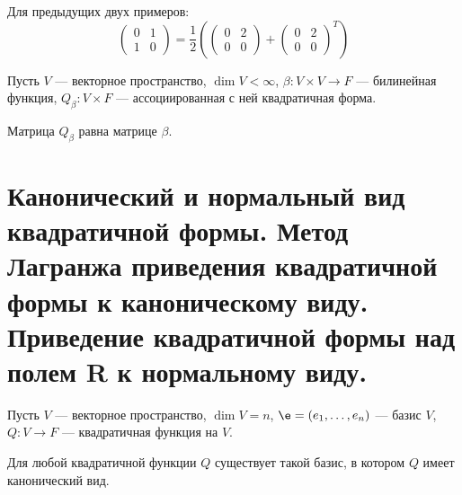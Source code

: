 \begin{Examples}
Для предыдущих двух примеров:
$$
\begin{pmatrix}
0 & 1 \\
1 & 0
\end{pmatrix} = \frac{1}{2}\left(
\begin{pmatrix}
0 & 2 \\
0 & 0
\end{pmatrix}
+ 
\begin{pmatrix}
0 & 2 \\
0 & 0
\end{pmatrix}^T
\right)
$$
\end{Examples}

Пусть $V$ --- векторное пространство, $\dim V < \infty$, $\beta \colon V \times V \rightarrow F$ --- билинейная функция, $Q_\beta \colon V \times F$ --- ассоциированная с ней квадратичная форма.

Матрица $Q_\beta$ равна матрице $\beta$.

\section{Канонический и нормальный вид квадратичной формы. Метод Лагранжа приведения квадратичной формы к каноническому виду. Приведение квадратичной формы над полем R к нормальному виду.}


Пусть $V$ --- векторное пространство, $\dim V = n$, $\e = \vector{e}$ --- базис $V$, $Q \colon V \rightarrow F$ --- квадратичная функция на $V$.

\begin{Theorem}
Для любой квадратичной функции $Q$ существует такой базис, в котором $Q$ имеет канонический вид.
\end{Theorem}

